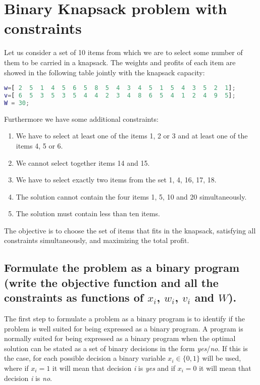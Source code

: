
\chapter{Binary Knapsack problem with constraints}
\label{ch:OL_1}

Let us consider a set of 10 items from which we are to select some number of them to be carried in a knapsack. The weights and profits of each item are showed in the following table jointly with the knapsack capacity:
\begin{lstlisting}[language=Matlab,frame=none]
% Object data
w=[ 2  5  1  4  5  6  5  8  5  4  3  4  5  1  5  4  3  5  2  1]; 		% weights
v=[ 6  5  3  5  3  5  4  4  2  3  4  8  6  5  4  1  2  4  9  5]; 		% values
W = 30;    																% Knapsack capacity	
\end{lstlisting}
Furthermore we have some additional constraints:
\begin{enumerate}
\item We have to select at least one of the items 1, 2 or 3 and at least one of the items 4, 5 or 6.
\item We cannot select together items 14 and 15.
\item We have to select exactly two items from the set {1, 4, 16, 17, 18}.
\item The solution cannot contain the four items 1, 5, 10 and 20 simultaneously.
\item The solution must contain less than ten items.
\end{enumerate}
The objective is to choose the set of items that fits in the knapsack, satisfying all constraints simultaneously, and maximizing the total profit.

\section{Formulate the problem as a binary program (write the objective function and all the constraints as functions of $x_i$, $w_i$, $v_i$ and $W$).}

The first step to formulate a problem as a binary program is to identify if the problem is well suited for being expressed as a binary program. A program is normally suited for being expressed as a binary program when the optimal solution can be stated as a set of binary decisions in the form \textit{yes}/\textit{no}. If this is the case, for each possible decision a binary variable $x_i\in\lbrace 0,1 \rbrace$ will be used, where if $x_i=1$ it will mean that decision \textit{i} is \textit{yes} and if $x_i=0$  it will mean that decision \textit{i} is \textit{no}.

